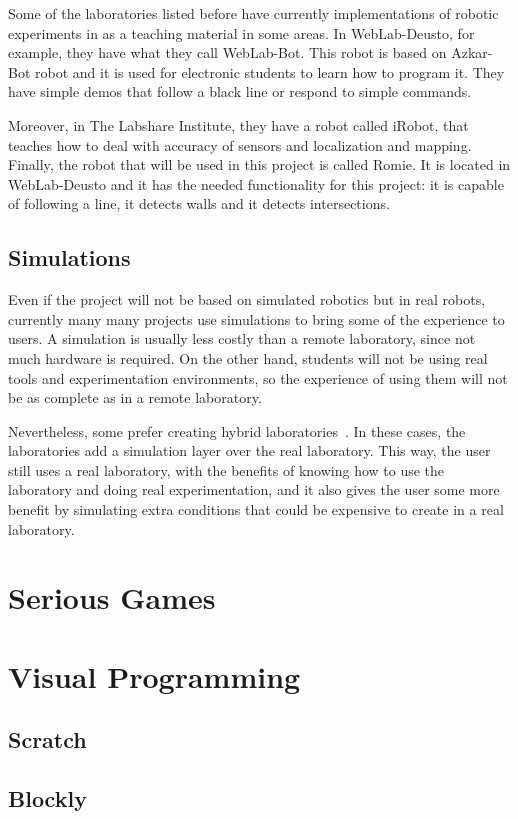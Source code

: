 Some of the laboratories listed before have currently implementations of robotic experiments in
as a teaching material in some areas. In WebLab-Deusto, for example, they have what they call
WebLab-Bot. This robot is based on Azkar-Bot robot and it is used for electronic students to learn
how to program it. They have simple demos that follow a black line or respond to simple commands.


Moreover, in The Labshare Institute, they have a robot called iRobot, that teaches how to deal with
accuracy of sensors and localization and mapping. Finally, the robot that will be used in this
project is called Romie. It is located in WebLab-Deusto and it has the needed functionality for this
project: it is capable of following a line, it detects walls and it detects intersections.


\subsection{Simulations}

Even if the project will not be based on simulated robotics but in real robots, currently many
many projects use simulations to bring some of the experience to users. A simulation is usually
less costly than a remote laboratory, since not much hardware is required. On the other hand,
students will not be using real tools and experimentation environments, so the experience of using
them will not be as complete as in a remote laboratory.

Nevertheless, some prefer creating hybrid laboratories~\cite{hybrid_labs}. In these cases, the
laboratories add a simulation layer over the real laboratory. This way, the user still uses a real
laboratory, with the benefits of knowing how to use the laboratory and doing real experimentation,
and it also gives the user some more benefit by simulating extra conditions that could be expensive
to create in a real laboratory.

\section{Serious Games}

\section{Visual Programming}

\subsection{Scratch}

\subsection{Blockly}
